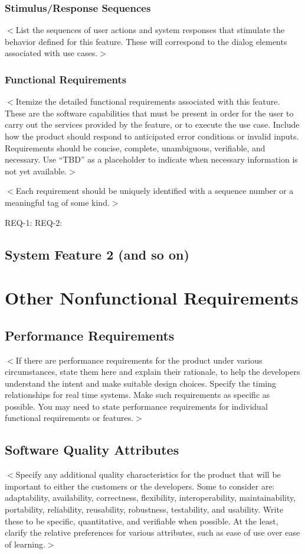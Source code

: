 \documentclass{scrreprt}
\begin{document}
\subsection{Stimulus/Response Sequences}
$<$List the sequences of user actions and system responses that stimulate the 
behavior defined for this feature. These will correspond to the dialog elements 
associated with use cases.$>$

\subsection{Functional Requirements}
$<$Itemize the detailed functional requirements associated with this feature.  
These are the software capabilities that must be present in order for the user 
to carry out the services provided by the feature, or to execute the use case.  
Include how the product should respond to anticipated error conditions or 
invalid inputs. Requirements should be concise, complete, unambiguous, 
verifiable, and necessary. Use “TBD” as a placeholder to indicate when necessary 
information is not yet available.$>$

$<$Each requirement should be uniquely identified with a sequence number or a 
meaningful tag of some kind.$>$

REQ-1:	REQ-2:

\section{System Feature 2 (and so on)}


\chapter{Other Nonfunctional Requirements}

\section{Performance Requirements}

$<$If there are performance requirements for the product under various 
circumstances, state them here and explain their rationale, to help the 
developers understand the intent and make suitable design choices. Specify the 
timing relationships for real time systems. Make such requirements as specific 
as possible. You may need to state performance requirements for individual 
functional requirements or features.$>$

\section{Software Quality Attributes}
$<$Specify any additional quality characteristics for the product that will be 
important to either the customers or the developers. Some to consider are: 
adaptability, availability, correctness, flexibility, interoperability, 
maintainability, portability, reliability, reusability, robustness, testability, 
and usability. Write these to be specific, quantitative, and verifiable when 
possible. At the least, clarify the relative preferences for various attributes, 
such as ease of use over ease of learning.$>$
\end{document}
